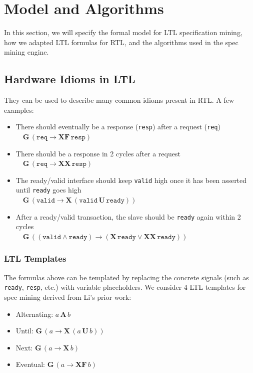 \documentclass[acmlarge,11pt]{acmart}
\begin{document}
\section{Model and Algorithms}
In this section, we will specify the formal model for LTL specification mining, how we adapted LTL formulas for RTL, and the algorithms used in the spec mining engine.

\subsection{Hardware Idioms in LTL}
They can be used to describe many common idioms present in RTL. A few examples:
\begin{itemize}
  \item There should eventually be a response (\texttt{resp}) after a request (\texttt{req}) \\
    $\quad \mathbf{G}\, (\mathtt{req} \rightarrow \mathbf{XF}\, \mathtt{resp})$
  \item There should be a response in 2 cycles after a request \\
    $\quad \mathbf{G}\, (\mathtt{req} \rightarrow \mathbf{XX}\, \mathtt{resp})$
  \item The ready/valid interface should keep \texttt{valid} high once it has been asserted until \texttt{ready} goes high \\
    $\quad \mathbf{G}\, (\mathtt{valid} \rightarrow \mathbf{X}\, (\mathtt{valid}\, \mathbf{U}\, \mathtt{ready}))$
  \item After a ready/valid transaction, the slave should be \texttt{ready} again within 2 cycles \\
    $\quad \mathbf{G}\, ((\mathtt{valid} \land \mathtt{ready}) \rightarrow (\mathbf{X}\, \mathtt{ready} \lor \mathbf{XX}\, \mathtt{ready}))$
\end{itemize}

\subsubsection{LTL Templates} \label{templates}
The formulas above can be templated by replacing the concrete signals (such as \texttt{ready}, \texttt{resp}, etc.) with variable placeholders. We consider 4 LTL templates for spec mining derived from Li's prior work\cite{Li_2014}:

\begin{itemize}
  \item Alternating: $a\, \mathbf{A}\, b$
  \item Until: $\mathbf{G}\, (a \rightarrow \mathbf{X}\, (a\, \mathbf{U}\, b))$
  \item Next: $\mathbf{G}\, (a \rightarrow \mathbf{X}\, b)$
  \item Eventual: $\mathbf{G}\, (a \rightarrow \mathbf{X F}\, b)$
\end{itemize}
\end{document}
